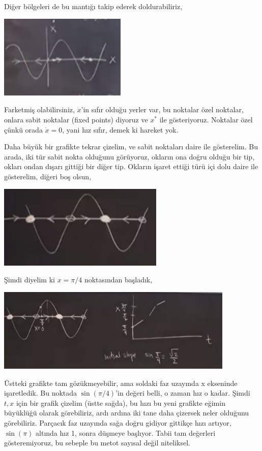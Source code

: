 \documentclass[12pt,fleqn]{article}\usepackage{../../common}
\begin{document}
Diğer bölgeleri de bu mantığı takip ederek doldurabiliriz, 

\includegraphics[height=4cm]{1_04.png}

Farketmiş olabilirsiniz, $\dot{x}$'in sıfır olduğu yerler var, bu noktalar
özel noktalar, onlara sabit noktalar (fixed points) diyoruz ve $x^\ast$ ile
gösteriyoruz. Noktalar özel çünkü orada $\dot{x}=0$, yani hız sıfır, demek
ki hareket yok. 

Daha büyük bir grafikte tekrar çizelim, ve sabit noktaları daire ile
gösterelim. Bu arada, iki tür sabit nokta olduğunu görüyoruz, okların ona
doğru olduğu bir tip, okları ondan dışarı gittiği bir diğer tip. Okların
işaret ettiği türü içi dolu daire ile gösterelim, diğeri boş olsun,

\includegraphics[height=4cm]{1_05.png}

Şimdi diyelim ki $x=\pi/4$ noktasından başladık, 

\includegraphics[height=4cm]{1_06.png}

Üstteki grafikte tam gözükmeyebilir, ama soldaki faz uzayında x ekseninde
işaretledik. Bu noktada $\sin(\pi/4)$'in değeri belli, o zaman hız o
kadar. Şimdi $t,x$ için bir grafik çizelim (üstte sağda), bu hızı bu yeni
grafikte eğimin büyüklüğü olarak görebiliriz, ardı ardına iki tane daha
çizersek neler olduğunu görebiliriz. Parçacık faz uzayında sağa doğru
gidiyor gittikçe hızı artıyor, $\sin(\pi)$ altında hız 1, sonra düşmeye
başlıyor. Tabii tam değerleri gösteremiyoruz, bu sebeple bu metot
sayısal değil niteliksel. 
\end{document}
